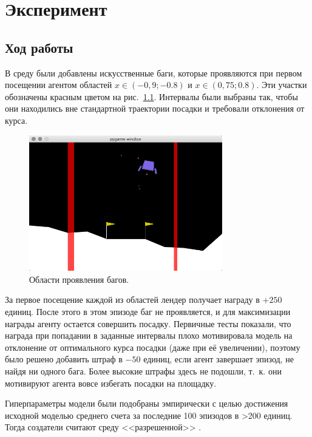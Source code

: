 \chapter{Эксперимент}
\label{cha:research}

\section{Ход работы}

В среду были добавлены искусственные баги, которые проявляются при первом посещении агентом областей \(x \in (-0,9; -0.8)\) и \(x \in (0,75; 0.8)\). Эти участки обозначены красным цветом на рис.~\ref{fig:bugLocations}. Интервалы были выбраны так, чтобы они находились вне стандартной траектории посадки и требовали отклонения от курса.

\begin{figure}
	\centering
	\includegraphics[width=0.75\textwidth]{figures/bug locations}
	\caption{Области проявления багов.}
	\label{fig:bugLocations}
\end{figure}

За первое посещение каждой из областей лендер получает награду в \(+250\) единиц. После этого в этом эпизоде баг не проявляется, и для максимизации награды агенту остается совершить посадку. Первичные тесты показали, что награда при попадании в заданные интервалы плохо мотивировала модель на отклонение от оптимального курса посадки (даже при её увеличении), поэтому было решено добавить штраф в \(-50\) единиц, если агент завершает эпизод, не найдя ни одного бага. Более высокие штрафы здесь не подошли, т.~к. они мотивируют агента вовсе избегать посадки на площадку.

Гиперпараметры модели были подобраны эмпирически с целью достижения исходной моделью среднего счета за последние 100 эпизодов в >200 единиц. Тогда создатели считают среду <<разрешенной>> \cite{lunarlanderv2}.

